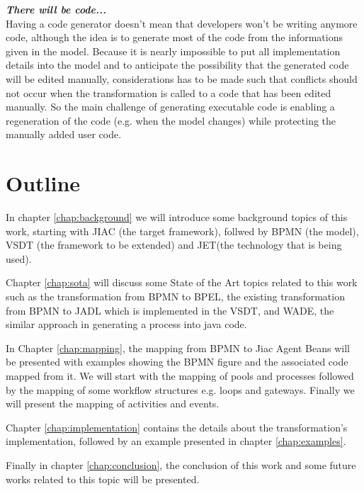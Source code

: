 \textbf{\textit{There will be code...} }\\
Having a code generator doesn't mean that developers won't be writing anymore code, although the idea is to generate most of the code from the informations given in the model. Because it is nearly impossible to put all implementation details into the model and to anticipate the possibility that the generated code will be edited manually, considerations has to be made such that conflicts should not occur when the transformation is called to a code that has been edited manually. So the main challenge of generating executable code is enabling a regeneration of the code (e.g. when the model changes) while protecting the manually added user code. 


\section{Outline}
In chapter \ref{chap:background} we will introduce some background topics of this work, starting with JIAC (the target framework), follwed by BPMN (the model), VSDT (the framework to be extended) and JET(the technology that is being used).

Chapter \ref{chap:sota} will discuss some State of the Art topics related to this work such as the transformation from BPMN to BPEL, the existing transformation from BPMN to JADL which is implemented in the VSDT, and WADE, the similar approach in generating a process into java code.

In Chapter \ref{chap:mapping}, the mapping from BPMN to Jiac Agent Beans will be presented with examples showing the BPMN figure and the associated code mapped from it. We will start with the mapping of pools and processes followed by the mapping of some workflow structures e.g. loops and gateways. Finally we will present the mapping of activities and events.

Chapter \ref{chap:implementation} contains the details about the transformation's implementation, followed by an example presented in chapter \ref{chap:examples}. 

Finally in chapter \ref{chap:conclusion}, the conclusion of this work and some future works related to this topic will be presented.